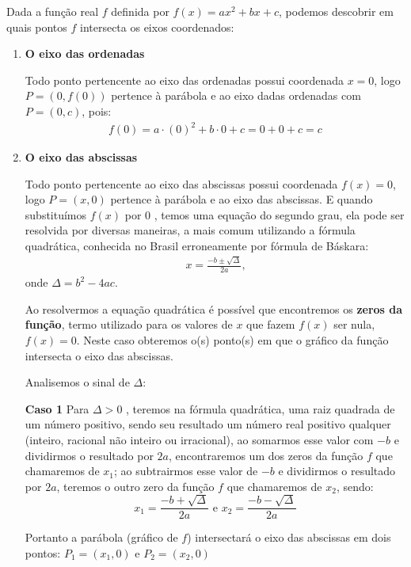 Dada a função real \(f\) definida por \(f(x)=ax^2+bx+c\), podemos descobrir em quais pontos \(f\) intersecta os eixos coordenados:
\begin{enumerate}
\item {} 
\textbf{O eixo das ordenadas}

Todo ponto pertencente ao eixo das ordenadas possui coordenada \(x=0\), logo \(P=(0,f(0))\) pertence à parábola e ao eixo dadas ordenadas com \(P=(0,c)\), pois:
\begin{equation*}
\begin{split}f(0)=a\cdot(0)^2+b\cdot0 + c = 0 + 0 + c = c\end{split}
\end{equation*}
\item {} 
\textbf{O eixo das abscissas}

Todo ponto pertencente ao eixo das abscissas possui coordenada \(f(x)=0\), logo \(P=(x,0)\) pertence à parábola e ao eixo das abscissas. E quando substituímos \(f(x)\) por \(0\) , temos uma equação do segundo grau, ela pode ser resolvida por diversas maneiras, a mais comum utilizando a fórmula quadrática, conhecida no Brasil erroneamente por fórmula de Báskara:
\begin{equation*}
\begin{split}x=\frac{-b\pm\sqrt{\Delta}}{2a} \text{,}\end{split}
\end{equation*}
onde \(\Delta=b^2-4ac\).

Ao resolvermos a equação quadrática é possível que encontremos os \textbf{zeros da função}, termo utilizado para os valores de \(x\) que fazem \(f(x)\) ser nula, \(f(x)=0\). Neste caso obteremos o(s) ponto(s) em que o gráfico da função intersecta o eixo das abscissas.

Analisemos o sinal de \(\Delta\):

\textbf{Caso 1} Para \(\Delta>0\) , teremos na fórmula quadrática, uma raiz quadrada de um número positivo, sendo seu resultado um número real positivo qualquer (inteiro, racional não inteiro ou irracional), ao somarmos esse valor com \(-b\) e dividirmos o resultado por \(2a\),  encontraremos um dos zeros da função \(f\) que chamaremos de \(x_1\); ao subtrairmos esse valor de \(-b\) e dividirmos o resultado por \(2a\), teremos o outro zero da função \(f\) que chamaremos de \(x_2\), sendo: $$x_1= \frac{-b+\sqrt{\Delta}}{2a} \text{ e } x_2=\frac{-b-\sqrt{\Delta}}{2a}$$

Portanto a parábola (gráfico de \(f\)) intersectará o eixo das abscissas em dois pontos: \(P_1=(x_1,0)\)  e \(P_2=(x_2,0)\)
\begin{figure}[H]
\centering
\begin{multicols}{2}
\begin{tikzpicture}[yscale=.5, scale=.9]


\end{tikzpicture}
\end{multicols}
\end{figure}
\end{enumerate}
